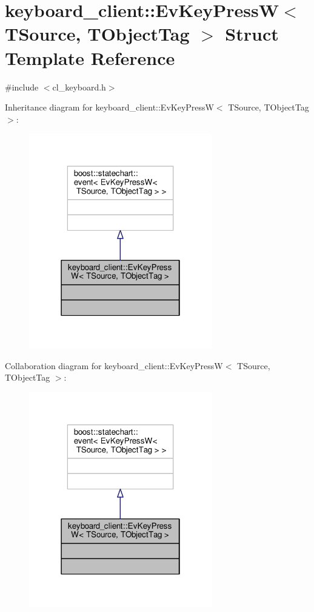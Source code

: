 \hypertarget{structkeyboard__client_1_1EvKeyPressW}{}\section{keyboard\+\_\+client\+:\+:Ev\+Key\+PressW$<$ T\+Source, T\+Object\+Tag $>$ Struct Template Reference}
\label{structkeyboard__client_1_1EvKeyPressW}


{\ttfamily \#include $<$cl\+\_\+keyboard.\+h$>$}



Inheritance diagram for keyboard\+\_\+client\+:\+:Ev\+Key\+PressW$<$ T\+Source, T\+Object\+Tag $>$\+:\nopagebreak
\begin{figure}[H]
\begin{center}
\leavevmode
\includegraphics[width=226pt]{structkeyboard__client_1_1EvKeyPressW__inherit__graph}
\end{center}
\end{figure}


Collaboration diagram for keyboard\+\_\+client\+:\+:Ev\+Key\+PressW$<$ T\+Source, T\+Object\+Tag $>$\+:\nopagebreak
\begin{figure}[H]
\begin{center}
\leavevmode
\includegraphics[width=226pt]{structkeyboard__client_1_1EvKeyPressW__coll__graph}
\end{center}
\end{figure}


